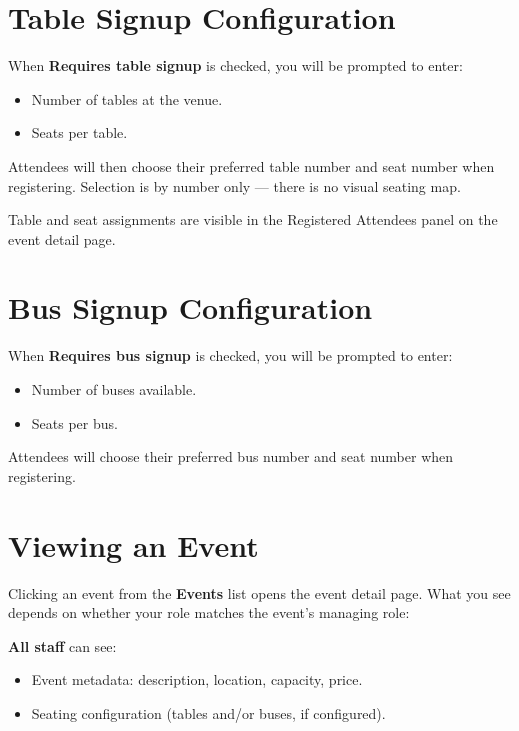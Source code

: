 \documentclass[12pt, twoside]{report}
\newcommand{\uielem}[1]{\textbf{#1}}
\begin{document}
\section{Table Signup Configuration}
\label{sec:table}

When \uielem{Requires table signup} is checked, you will be prompted to enter:
\begin{itemize}
  \item Number of tables at the venue.
  \item Seats per table.
\end{itemize}

Attendees will then choose their preferred table number and seat number
when registering. Selection is by number only --- there is no visual seating map.

\begin{notebox}
Table and seat assignments are visible in the Registered Attendees panel
on the event detail page.
\end{notebox}

\section{Bus Signup Configuration}
\label{sec:bus}

When \uielem{Requires bus signup} is checked, you will be prompted to enter:
\begin{itemize}
  \item Number of buses available.
  \item Seats per bus.
\end{itemize}

Attendees will choose their preferred bus number and seat number when registering.

\section{Viewing an Event}

Clicking an event from the \uielem{Events} list opens the event detail page.
What you see depends on whether your role matches the event's managing role:

\textbf{All staff} can see:
\begin{itemize}
  \item Event metadata: description, location, capacity, price.
  \item Seating configuration (tables and/or buses, if configured).
\end{itemize}
\end{document}
